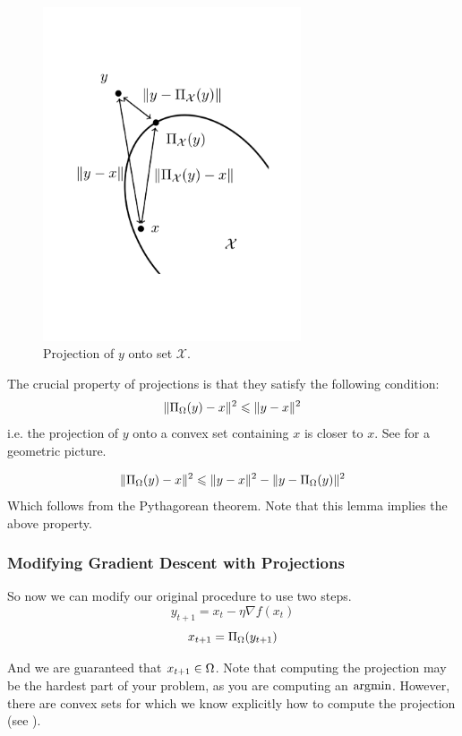 \begin{figure}
\begin{center}
\includegraphics[width=3in]{figures/lecture2-projection}
\end{center}
\caption{Projection of $y$ onto set $\mathcal{X}$. }
\end{figure}

The crucial property of projections is that they satisfy the following condition:
\[
\| \Pi_{\Omega}(y) - x \|^2 \leqslant \| y - x \|^2
\]
i.e. the projection of $y$ onto a convex set containing $x$ is closer to $x$. See  for a geometric picture.

\begin{lemma}
\[
\| \Pi_{\Omega}(y) - x \|^2 \leqslant \| y - x \|^2 - \| y - \Pi_{\Omega}(y) \|^2
\]
Which follows from the Pythagorean theorem. Note that this lemma implies the above property.
\end{lemma}

\subsubsection{Modifying Gradient Descent with Projections}

So now we can modify our original procedure to use two steps.
\[
y_{t+1} = x_t - \eta \nabla f(x_t)
\]
\[
x_{t+1} = \Pi_{\Omega}(y_{t+1})
\]

And we are guaranteed that $x_{t+1}\in\Omega$. Note that computing the projection may be the hardest part of your problem, as you are computing an $\operatorname*{\arg\!\min}$. However, there are convex sets for which we know explicitly how to compute the projection (see ).

